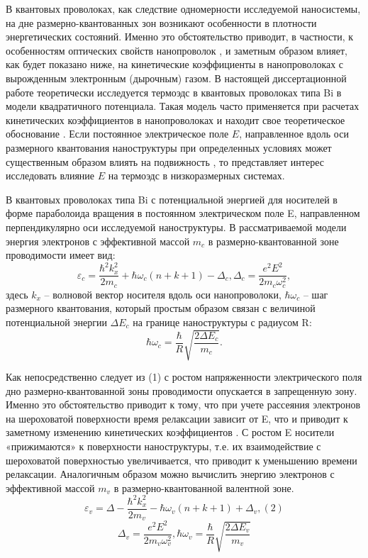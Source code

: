 В квантовых проволоках, как следствие одномерности исследуемой наносистемы, на дне размерно-квантованных зон возникают особенности в плотности энергетических состояний. Именно это обстоятельство приводит, в частности, к особенностям оптических свойств нанопроволок \cite{Black2003a,Black2000,Black2002,Levin2009a}, и заметным образом влияет, как будет показано ниже, на кинетические коэффициенты в нанопроволоках с вырожденным электронным (дырочным) газом. В настоящей диссертационной работе теоретически исследуется термоэдс в квантовых проволоках типа Bi в модели квадратичного потенциала. Такая модель часто применяется при расчетах кинетических коэффициентов в нанопроволоках \cite{Geiler1998,Geiler1999} и находит свое теоретическое обоснование \cite{Beenakker1991}. Если постоянное электрическое поле $E$, направленное вдоль оси размерного квантования наноструктуры при определенных условиях может существенным образом влиять на подвижность \cite{Karapetyan2011}, то представляет интерес исследовать влияние $E$ на термоэдс в низкоразмерных системах.
 
В квантовых проволоках типа Bi с потенциальной энергией для носителей в форме параболоида вращения в постоянном электрическом поле E, направленном перпендикулярно оси исследуемой наноструктуры. В рассматриваемой модели энергия электронов с эффективной массой $m_{c} $ в размерно-квантованной зоне проводимости имеет вид:
\begin{equation} \label{eq:44_10}
\varepsilon _{c} =\frac{\hbar ^{2} k_{x}^{2} }{2m_{c} } +\hbar \omega _{c} \left(n+k+1\right)-\Delta _{c} , \Delta _{c} =\frac{e^{2} E^{2} }{2m_{c} \omega _{c}^{2} } , 
\end{equation} 
здесь $k_{x} $ -- волновой вектор носителя вдоль оси нанопроволоки, $\hbar \omega _{c} $ -- шаг размерного квантования, который простым образом связан с величиной потенциальной энергии $\Delta E_{c} $ на границе наноструктуры с радиусом R:
\[
\hbar \omega _{c} =\frac{\hbar }{R} \sqrt{\frac{2\Delta E_{c} }{m_{c} } } .
\] 

Как непосредственно следует из (1) с ростом напряженности электрического поля дно размерно-квантованной зоны проводимости опускается в запрещенную зону. Именно это обстоятельство приводит к тому, что при учете рассеяния электронов на шероховатой поверхности время релаксации зависит от E, что и приводит к заметному изменению кинетических коэффициентов \cite{Karapetyan2011}. С ростом E носители «прижимаются» к поверхности наноструктуры, т.е. их взаимодействие с шероховатой поверхностью увеличивается, что приводит к уменьшению времени релаксации. Аналогичным образом можно вычислить энергию электронов с эффективной массой $m_{v} $ в размерно-квантованной валентной зоне.
\begin{equation} \label{eq:44_20}
\varepsilon _{v} =\Delta -\frac{\hbar ^{2} k_{x}^{2} }{2m_{v} } -\hbar \omega _{v} \left(n+k+1\right)+\Delta _{v} , (2)
\end{equation} 
\[
\Delta _{v} =\frac{e^{2} E^{2} }{2m_{v} \omega _{v}^{2} } , \hbar \omega _{v} =\frac{\hbar }{R} \sqrt{\frac{2\Delta E_{v} }{m_{v} } } 
\] 


